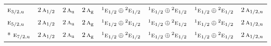 \documentclass[10pt,a4paper]{article}
\numberwithin{equation}{section}
\newcommand{\irr}[1]{\text{\normalfont\scshape #1}}
\newcommand{\conjpair}[1]{{}^{#1}}
\newcommand{\ptag}[1]{\mathrm{#1}}
\begin{document}
{\begin{longtable}{@{}lccccccc@{}}
$\irr{e}_{3/2,\ptag{u}}$ & $2\,\irr{a}_{1/2}$ & $2\,\irr{a}_{\ptag{u}}$ & $2\,\irr{a}_{\ptag{g}}$ & $\conjpair{1}\irr{e}_{1/2}\oplus \conjpair{2}\irr{e}_{1/2}$ & $\conjpair{1}\irr{e}_{1/2}\oplus \conjpair{2}\irr{e}_{1/2}$ & $\conjpair{1}\irr{e}_{1/2}\oplus \conjpair{2}\irr{e}_{1/2}$ & $2\,\irr{a}_{1/2,\ptag{u}}$\\
$\irr{e}_{5/2,\ptag{u}}$ & $2\,\irr{a}_{1/2}$ & $2\,\irr{a}_{\ptag{u}}$ & $2\,\irr{a}_{\ptag{g}}$ & $\conjpair{1}\irr{e}_{1/2}\oplus \conjpair{2}\irr{e}_{1/2}$ & $\conjpair{1}\irr{e}_{1/2}\oplus \conjpair{2}\irr{e}_{1/2}$ & $\conjpair{1}\irr{e}_{1/2}\oplus \conjpair{2}\irr{e}_{1/2}$ & $2\,\irr{a}_{1/2,\ptag{u}}$\\*
$\irr{e}_{7/2,\ptag{u}}$ & $2\,\irr{a}_{1/2}$ & $2\,\irr{a}_{\ptag{u}}$ & $2\,\irr{a}_{\ptag{g}}$ & $\conjpair{1}\irr{e}_{1/2}\oplus \conjpair{2}\irr{e}_{1/2}$ & $\conjpair{1}\irr{e}_{1/2}\oplus \conjpair{2}\irr{e}_{1/2}$ & $\conjpair{1}\irr{e}_{1/2}\oplus \conjpair{2}\irr{e}_{1/2}$ & $2\,\irr{a}_{1/2,\ptag{u}}$\\
\bottomrule\end{longtable}}
\end{document}
